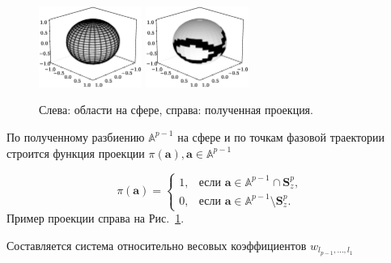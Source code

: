 \documentclass[12pt,twoside]{article}
\begin{document}
\begin{figure}[h]
\centering
  {\includegraphics[width=0.3\textwidth]{figs/sphere_grid.eps}}
  {\includegraphics[width=0.3\textwidth]{figs/pi_walk.eps}}\\
\caption{Слева: области на сфере, справа: полученная проекция.}
\label{fg:sp_mesh}
\end{figure}

По полученному разбиению $\mathbb{A}^{p-1}$ на сфере и по точкам фазовой траектории строится функция проекции $\pi(\mathbf{a}), \mathbf{a} \in \mathbb{A}^{p-1}$

\begin{equation}
    \pi(\mathbf{a}) =
    \begin{cases}
	1, & \mbox{если } \mathbf{a} \in \mathbb{A}^{p-1} \cap \mathbf{S}_{z}^{p},\\
    0, & \mbox{если } \mathbf{a} \in \mathbb{A}^{p-1} \setminus \mathbf{S}_{z}^{p}.
    \end{cases}
\label{eq:f_real}
\end{equation}
Пример проекции справа на Рис.~\ref{fg:sp_mesh}.

Составляется система относительно весовых коэффициентов $w_{l_{p-1},...,l_1}$ 
\end{document}
